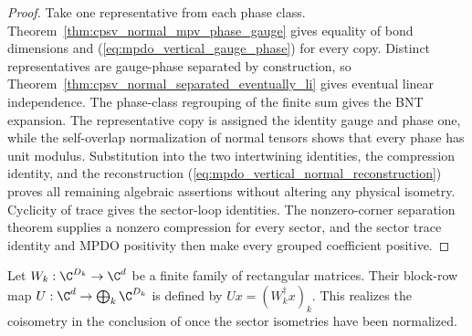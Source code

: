 \begin{proof}\leanok
    Take one representative from each phase class.
    Theorem~\ref{thm:cpsv_normal_mpv_phase_gauge} gives equality of bond
    dimensions and (\ref{eq:mpdo_vertical_gauge_phase}) for every copy.
    Distinct representatives are gauge-phase separated by construction, so
    Theorem~\ref{thm:cpsv_normal_separated_eventually_li} gives eventual linear
    independence. The phase-class regrouping of the finite sum gives the BNT
    expansion. The representative copy is assigned the identity gauge and
    phase one, while the self-overlap normalization of normal tensors shows
    that every phase has unit modulus. Substitution into the two intertwining
    identities, the compression identity, and the reconstruction
    (\ref{eq:mpdo_vertical_normal_reconstruction}) proves all remaining
    algebraic assertions without altering any physical isometry. Cyclicity of
    trace gives the sector-loop identities. The nonzero-corner separation
    theorem supplies a nonzero compression for every sector, and the sector
    trace identity and MPDO positivity then make every grouped coefficient
    positive.
\end{proof}

\begin{definition}
    \label{def:vertical_sector_block_row}
    \leanok
    Let $W_k:\C^{D_k}\to\C^d$ be a finite family of rectangular
    matrices. Their block-row map
    $U:\C^d\to\bigoplus_k\C^{D_k}$ is defined by
    $Ux=(W_k^\dagger x)_k$. This realizes the coisometry in the conclusion of
    \cite[Proposition~4.13, lines~1863--1870]{Cirac2016MPDO_arXiv} once the
    sector isometries have been normalized.
\end{definition}

